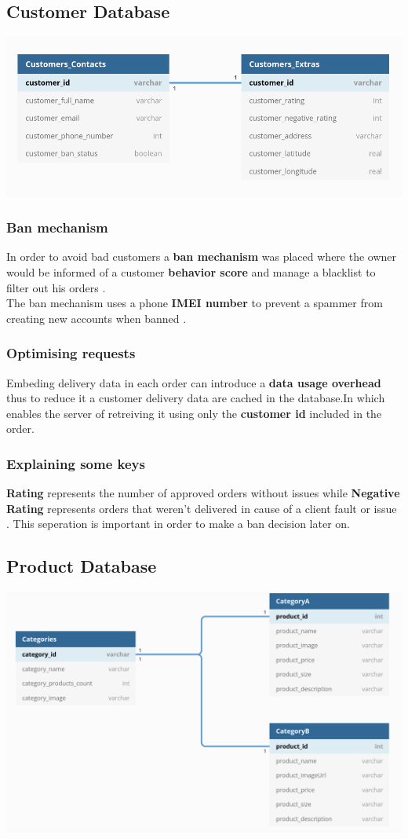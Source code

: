 \documentclass{article}
\begin{document}
\subsection{Customer Database}
\includegraphics[scale=0.3]{./out/NodeApp/Database/CustomersTable.png}\newline
\subsubsection{Ban mechanism}
In order to avoid bad customers a \textbf{ban mechanism} was placed where the owner would be informed of a customer \textbf{behavior score} and manage a blacklist to filter out his orders .\\
The ban mechanism uses a phone \textbf{IMEI number} to prevent a spammer from creating new accounts when banned .
\subsubsection{Optimising requests}
Embeding delivery data in each order can introduce a \textbf{data usage overhead} thus to reduce it a customer delivery data are cached in the database.In which enables the server of retreiving it using only the \textbf{customer id} included in the order. 
\subsubsection{Explaining some keys}
\textbf{Rating} represents the number of approved orders without issues while \textbf{Negative Rating} represents orders that weren't delivered in cause of a client fault or issue . This seperation is important in order to make a ban decision later on.

\subsection{Product Database}
\includegraphics[scale=0.3]{./out/NodeApp/Database/ProductsTable.png}
\end{document}
